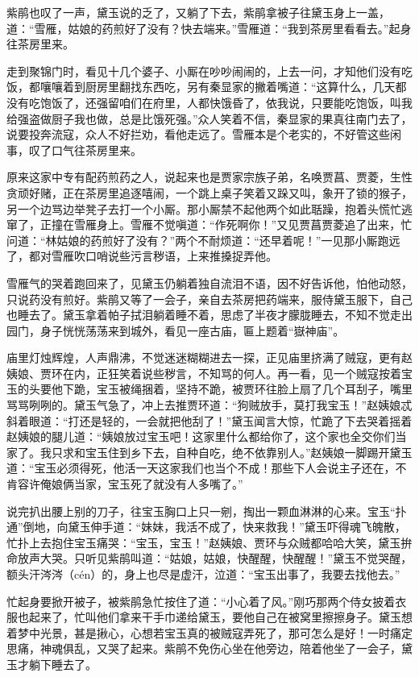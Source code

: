 \documentclass[12pt,oneside]{book}
\begin{document}
紫鹃也叹了一声，黛玉说的乏了，又躺了下去，紫鹃拿被子往黛玉身上一盖，道：“雪雁，姑娘的药煎好了没有？快去端来。”雪雁道：“我到茶房里看看去。”起身往茶房里来。

走到聚锦门时，看见十几个婆子、小厮在吵吵闹闹的，上去一问，才知他们没有吃饭，都嚷嚷着到厨房里翻找东西吃，另有秦显家的撇着嘴道：“这算什么，几天都没有吃饱饭了，还强留咱们在府里，人都快饿昏了，依我说，只要能吃饱饭，叫我给强盗做厨子我也做，总是比饿死强。”众人笑着不信，秦显家的果真往南门去了，说要投奔流寇，众人不好拦劝，看他走远了。雪雁本是个老实的，不好管这些闲事，叹了口气往茶房里来。

原来这家中专有配药煎药之人，说起来也是贾家宗族子弟，名唤贾菖、贾菱，生性贪顽好赌，正在茶房里追逐嘻闹，一个跳上桌子笑着又跺又叫，象开了锁的猴子，另一个边骂边举凳子去打一个小厮。那小厮禁不起他两个如此聒躁，抱着头慌忙逃窜了，正撞在雪雁身上。雪雁不觉嗔道：“作死啊你！”又见贾菖贾菱追了出来，忙问道：“林姑娘的药煎好了没有？”两个不耐烦道：“还早着呢！”一见那小厮跑远了，都对雪雁吹口哨说些污言秽语，上来推搡捉弄他。

雪雁气的哭着跑回来了，见黛玉仍躺着独自流泪不语，因不好告诉他，怕他动怒，只说药没有煎好。紫鹃又等了一会子，亲自去茶房把药端来，服侍黛玉服下，自己也睡去了。黛玉拿着帕子拭泪躺着睡不着，思虑了半夜才朦胧睡去，不知不觉走出园门，身子恍恍荡荡来到城外，看见一座古庙，匾上题着“嶽神庙”。

庙里灯烛辉煌，人声鼎沸，不觉迷迷糊糊进去一探，正见庙里挤满了贼寇，更有赵姨娘、贾环在内，正狂笑着说些秽言，不知骂的何人。再一看，见一个贼寇按着宝玉的头要他下跪，宝玉被绳捆着，坚持不跪，被贾环往脸上扇了几个耳刮子，嘴里骂骂咧咧的。黛玉气急了，冲上去推贾环道：“狗贼放手，莫打我宝玉！”赵姨娘忒斜着眼道：“打还是轻的，一会就把他刮了！”黛玉闻言大惊，忙跪了下去哭着摇着赵姨娘的腿儿道：“姨娘放过宝玉吧！这家里什么都给你了，这个家也全交你们当家了。我只求和宝玉住到乡下去，自种自吃，绝不依靠别人。”赵姨娘一脚踢开黛玉道：“宝玉必须得死，他活一天这家我们也当个不成！那些下人会说主子还在，不肯容许俺娘俩当家，宝玉死了就没有人多嘴了。”

说完扒出腰上别的刀子，往宝玉胸口上只一剜，掏出一颗血淋淋的心来。宝玉“扑通”倒地，向黛玉伸手道：“妹妹，我活不成了，快来救我！”黛玉吓得魂飞魄散，忙扑上去抱住宝玉痛哭：“宝玉，宝玉！”赵姨娘、贾环与众贼都哈哈大笑，黛玉拚命放声大哭。只听见紫鹃叫道：“姑娘，姑娘，快醒醒，快醒醒！”黛玉不觉哭醒，额头汗涔涔（cén）的，身上也尽是虚汗，泣道：“宝玉出事了，我要去找他去。”

忙起身要掀开被子，被紫鹃急忙按住了道：“小心着了风。”刚巧那两个侍女披着衣服也起来了，忙叫他们拿来干手巾递给黛玉，要他自己在被窝里擦擦身子。黛玉想着梦中光景，甚是揪心，心想若宝玉真的被贼寇弄死了，那可怎么是好！一时痛定思痛，神魂俱乱，又哭了起来。紫鹃不免伤心坐在他旁边，陪着他坐了一会子，黛玉才躺下睡去了。
\end{document}
